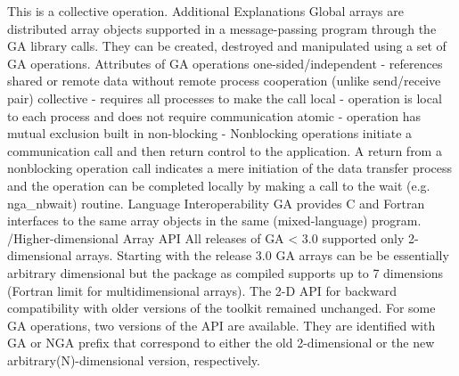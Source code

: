 This is a collective operation. Additional Explanations Global arrays
are distributed array objects supported in a message-passing program
through the GA library calls. They can be created, destroyed and manipulated
using a set of GA operations. Attributes of GA operations one-sided/independent
- references shared or remote data without remote process cooperation
(unlike send/receive pair) collective - requires all processes to
make the call local - operation is local to each process and does
not require communication atomic - operation has mutual exclusion
built in non-blocking - Nonblocking operations initiate a communication
call and then return control to the application. A return from a nonblocking
operation call indicates a mere initiation of the data transfer process
and the operation can be completed locally by making a call to the
wait (e.g. nga\_nbwait) routine. Language Interoperability GA provides
C and Fortran interfaces to the same array objects in the same (mixed-language)
program. /Higher-dimensional Array API All releases of GA < 3.0 supported
only 2-dimensional arrays. Starting with the release 3.0 GA arrays
can be be essentially arbitrary dimensional but the package as compiled
supports up to 7 dimensions (Fortran limit for multidimensional arrays).
The 2-D API for backward compatibility with older versions of the
toolkit remained unchanged. For some GA operations, two versions of
the API are available. They are identified with \textquotedbl{}GA\textquotedbl{}
or \textquotedbl{}NGA\textquotedbl{} prefix that correspond to either
the old 2-dimensional or the new arbitrary(N)-dimensional version,
respectively. 
